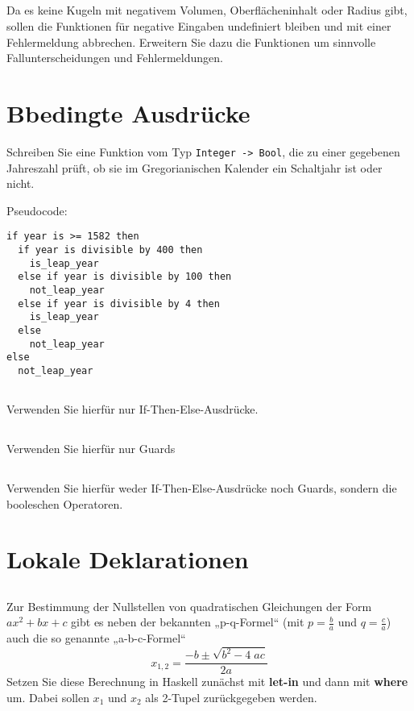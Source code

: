 \documentclass[
  10pt,                   %
  DIV12,
  german,                 %
  oneside,                %
  parskip=half,           %
  headings=normal,        %
  captions=tableheading,  %
]{scrartcl}
\begin{document}
\subsection{}
Da es keine Kugeln mit negativem Volumen, Oberflächeninhalt oder Radius
gibt, sollen die Funktionen für negative Eingaben undefiniert bleiben und mit
einer Fehlermeldung abbrechen. Erweitern Sie dazu die Funktionen um sinnvolle
Fallunterscheidungen und Fehlermeldungen.

\section{Bbedingte Ausdrücke}
Schreiben Sie eine Funktion vom Typ \lstinline|Integer -> Bool|, die zu einer gegebenen Jahreszahl prüft, ob sie im Gregorianischen Kalender ein Schaltjahr ist oder nicht.

Pseudocode:
\begin{lstlisting}
if year is >= 1582 then 
  if year is divisible by 400 then
    is_leap_year
  else if year is divisible by 100 then
    not_leap_year
  else if year is divisible by 4 then
    is_leap_year
  else
    not_leap_year
else
  not_leap_year
\end{lstlisting}
\subsection{}
Verwenden Sie hierfür nur If-Then-Else-Ausdrücke.
\subsection{}
Verwenden Sie hierfür nur Guards
\subsection{}
Verwenden Sie hierfür weder If-Then-Else-Ausdrücke noch Guards, sondern die
booleschen Operatoren.
\section{Lokale Deklarationen}
\subsection{}
Zur Bestimmung der Nullstellen von quadratischen Gleichungen
der Form $ax^2 + bx + c$ gibt es neben der bekannten „p-q-Formel“ 
(mit $p = \frac{b}{a}$ und $q = \frac{c}{a}$) auch die so genannte „a-b-c-Formel“
\begin{displaymath}
x_{1, 2} = \frac{-b \pm \sqrt{b^2 - 4\;ac}}{2a}
\end{displaymath}
Setzen Sie diese Berechnung in Haskell zunächst mit \textbf{let-in} und dann mit \textbf{where} um.
Dabei sollen $x_1$ und $x_2$ als 2-Tupel zurückgegeben werden.
\end{document}
